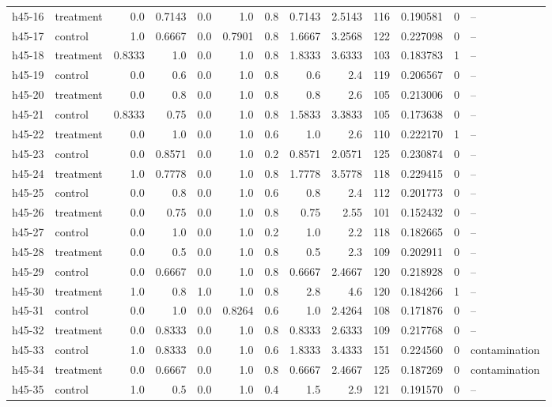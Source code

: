 \documentclass[11pt,a4paper]{article}
\begin{document}
\begin{footnotesize}
\begin{longtable}{llrrrrrrrrrrl}
h45-16 & treatment & 0.0 & 0.7143 & 0.0 & 1.0 & 0.8 & 0.7143 & 2.5143 & 116 & 0.190581 & 0 & -- \\
h45-17 & control & 1.0 & 0.6667 & 0.0 & 0.7901 & 0.8 & 1.6667 & 3.2568 & 122 & 0.227098 & 0 & -- \\
h45-18 & treatment & 0.8333 & 1.0 & 0.0 & 1.0 & 0.8 & 1.8333 & 3.6333 & 103 & 0.183783 & 1 & -- \\
h45-19 & control & 0.0 & 0.6 & 0.0 & 1.0 & 0.8 & 0.6 & 2.4 & 119 & 0.206567 & 0 & -- \\
h45-20 & treatment & 0.0 & 0.8 & 0.0 & 1.0 & 0.8 & 0.8 & 2.6 & 105 & 0.213006 & 0 & -- \\
h45-21 & control & 0.8333 & 0.75 & 0.0 & 1.0 & 0.8 & 1.5833 & 3.3833 & 105 & 0.173638 & 0 & -- \\
h45-22 & treatment & 0.0 & 1.0 & 0.0 & 1.0 & 0.6 & 1.0 & 2.6 & 110 & 0.222170 & 1 & -- \\
h45-23 & control & 0.0 & 0.8571 & 0.0 & 1.0 & 0.2 & 0.8571 & 2.0571 & 125 & 0.230874 & 0 & -- \\
h45-24 & treatment & 1.0 & 0.7778 & 0.0 & 1.0 & 0.8 & 1.7778 & 3.5778 & 118 & 0.229415 & 0 & -- \\
h45-25 & control & 0.0 & 0.8 & 0.0 & 1.0 & 0.6 & 0.8 & 2.4 & 112 & 0.201773 & 0 & -- \\
h45-26 & treatment & 0.0 & 0.75 & 0.0 & 1.0 & 0.8 & 0.75 & 2.55 & 101 & 0.152432 & 0 & -- \\
h45-27 & control & 0.0 & 1.0 & 0.0 & 1.0 & 0.2 & 1.0 & 2.2 & 118 & 0.182665 & 0 & -- \\
h45-28 & treatment & 0.0 & 0.5 & 0.0 & 1.0 & 0.8 & 0.5 & 2.3 & 109 & 0.202911 & 0 & -- \\
h45-29 & control & 0.0 & 0.6667 & 0.0 & 1.0 & 0.8 & 0.6667 & 2.4667 & 120 & 0.218928 & 0 & -- \\
h45-30 & treatment & 1.0 & 0.8 & 1.0 & 1.0 & 0.8 & 2.8 & 4.6 & 120 & 0.184266 & 1 & -- \\
h45-31 & control & 0.0 & 1.0 & 0.0 & 0.8264 & 0.6 & 1.0 & 2.4264 & 108 & 0.171876 & 0 & -- \\
h45-32 & treatment & 0.0 & 0.8333 & 0.0 & 1.0 & 0.8 & 0.8333 & 2.6333 & 109 & 0.217768 & 0 & -- \\
h45-33 & control & 1.0 & 0.8333 & 0.0 & 1.0 & 0.6 & 1.8333 & 3.4333 & 151 & 0.224560 & 0 & contamination \\
h45-34 & treatment & 0.0 & 0.6667 & 0.0 & 1.0 & 0.8 & 0.6667 & 2.4667 & 125 & 0.187269 & 0 & contamination \\
h45-35 & control & 1.0 & 0.5 & 0.0 & 1.0 & 0.4 & 1.5 & 2.9 & 121 & 0.191570 & 0 & -- \\

\end{longtable}
\end{footnotesize}
\end{document}

